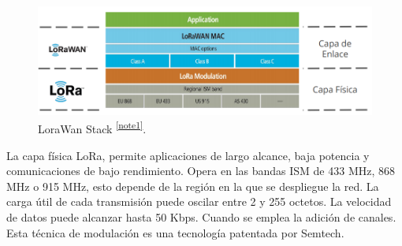 \begin{figure}[h]
	\centering
	\includegraphics[scale=.55]{./Figures/LoraWanClasses.PNG}
	\caption{LoraWan Stack \textsuperscript{\ref{note1}}\citep{LoRaAlliance2015}.}
	\label{fig:LoraStack}
\end{figure}



La capa física LoRa, permite aplicaciones de largo alcance, baja potencia y comunicaciones de bajo rendimiento. Opera en las bandas ISM de 433 MHz, 868 MHz o 915 MHz, esto depende de la región en la que se despliegue la red. La carga útil de cada transmisión puede oscilar entre 2 y 255 octetos. La velocidad de datos puede alcanzar hasta 50 Kbps. Cuando se emplea la adición de canales. Esta técnica de modulación es una tecnología patentada por Semtech\citep{FEHRI20181096}.

